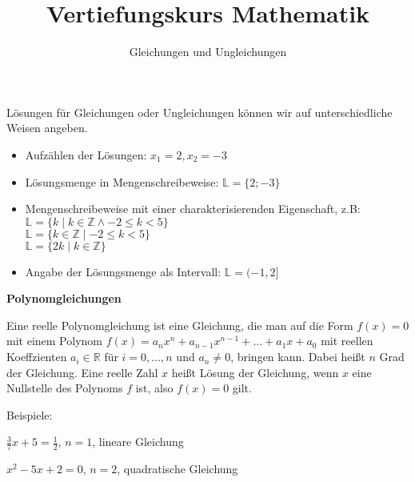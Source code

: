 \documentclass[11pt]{beamer}
\begin{document}
\title{Vertiefungskurs Mathematik}   
\author{Gleichungen und Ungleichungen} 
\date{}
\frame{\titlepage} 

\begin{frame}[fragile]

Lösungen für Gleichungen oder Ungleichungen können wir auf unterschiedliche Weisen angeben.
\begin{itemize}
\item Aufzählen der Lösungen:  $x_1 = 2, x_2 = -3$ \\
\item Lösungsmenge in Mengenschreibeweise: $\mathbb{L} = \{2; -3\}$ \\
\item Mengenschreibeweise mit einer charakterisierenden Eigenschaft, z.B:
 $\mathbb{L} = \{k \mid k \in \mathbb{Z} \land -2 \le k < 5 \}$ \\
 $\mathbb{L} = \{k \in \mathbb{Z} \mid -2 \le k < 5 \}$ \\
 $\mathbb{L} = \{2k \mid k \in \mathbb{Z} \}$ \\
\item Angabe der Lösungsmenge als Intervall:  $\mathbb{L} =(-1, 2]$ 

\end{itemize}
 
\end{frame}

\begin{frame}[fragile]
\textbf{Polynomgleichungen}

Eine reelle Polynomgleichung ist eine Gleichung, die man auf die Form $f(x) = 0$ mit
einem Polynom $f(x) = a_n x^n + a_{n-1} x^{n-1} + . . . + a_1 x + a_0$ mit reellen Koeffzienten
$a_i \in \mathbb{R}$ für $i = 0, . . . , n$ und $a_n \ne 0$, bringen kann. Dabei heißt $n$ Grad der Gleichung.
Eine reelle Zahl $x$ heißt Lösung der Gleichung,  wenn $x$ eine Nullstelle des Polynoms $f$ ist, also $f(x) = 0$ gilt.

\footnotesize
Beispiele:

\quad $\frac{3}{7}x + 5 = \frac{1}{2}$,   \quad $n = 1$,  lineare Gleichung

\quad $x^2 -5x +2 = 0$,   \quad $n = 2$,  quadratische Gleichung
\end{frame}
\end{document}

